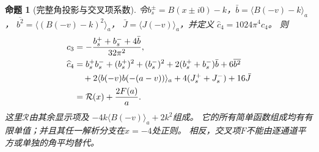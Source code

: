 \documentclass[11pt,a4paper]{ctexart}
\theoremstyle{cnplain}\newtheorem{theorem}{定理}[section]
\newtheorem{proposition}[theorem]{命题}
\theoremstyle{definition}\newtheorem{definition}[theorem]{定义}
\theoremstyle{remark}\newtheorem{remark}[theorem]{注}
\begin{document}
\begin{proposition}[完整角投影与交叉项系数]\label{prop:crosscoefficient}
令$b_s^\pm=B(x\pm i0)-k$，$\bar b=\langle B(-v)-k\rangle_a$，
$\overline{b^2}=\langle(B(-v)-k)^2\rangle_a$，
$\bar J=\langle J(-v)\rangle_a$，并定义
$\widehat c_4=1024\pi^4c_4$。
则
\begin{align}
 c_3&=-\frac{b_s^++b_s^-+4\bar b}{32\pi^2},\label{eq:c3full}\\
 \widehat c_4
 &= b_s^+b_s^-+(b_s^+)^2+(b_s^-)^2
   +2(b_s^++b_s^-)\bar b+6\overline{b^2}\notag\\
 &\quad+2\langle b(-v)b(-(a-v))\rangle_a
      +4(J_s^++J_s^-)+16\bar J \notag\\
 &=\mathcal R(x)+\frac{2F(a)}a .\label{eq:c4full}
\end{align}
这里$\mathcal R$由其余显示项及
$-4k\langle B(-v)\rangle_a+2k^2$组成。
它的所有简单函数组成均有有限单值；并且其任一解析分支在$x=-4$处正则。
相反，交叉项$F$不能由逐通道平方或单独的角平均替代。
\end{proposition}
\end{document}
